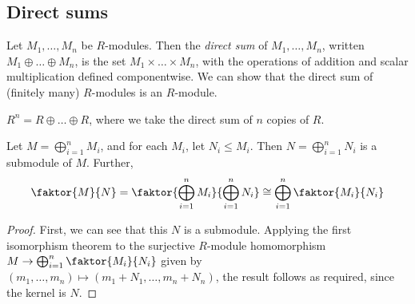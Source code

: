\subsection{Direct sums}
\begin{definition}
	Let \( M_1, \dots, M_n \) be \( R \)-modules.
	Then the \textit{direct sum} of \( M_1, \dots, M_n \), written \( M_1 \oplus \dots \oplus M_n \), is the set \( M_1 \times \dots \times M_n \), with the operations of addition and scalar multiplication defined componentwise.
	We can show that the direct sum of (finitely many) \( R \)-modules is an \( R \)-module.
\end{definition}
\begin{example}
	\( R^n = R \oplus \dots \oplus R \), where we take the direct sum of \( n \) copies of \( R \).
\end{example}
\begin{lemma}
	Let \( M = \bigoplus_{i=1}^n M_i \), and for each \( M_i \), let \( N_i \leq M_i \).
	Then \( N = \bigoplus_{i=1}^n N_i \) is a submodule of \( M \).
	Further,
	\[ \faktor{M}{N} = \faktor{\bigoplus_{i=1}^n M_i}{\bigoplus_{i=1}^n N_i} \cong \bigoplus_{i=1}^n \faktor{M_i}{N_i} \]
\end{lemma}
\begin{proof}
	First, we can see that this \( N \) is a submodule.
	Applying the first isomorphism theorem to the surjective \( R \)-module homomorphism \( M \to \bigoplus_{i=1}^n \faktor{M_i}{N_i} \) given by \( (m_1, \dots, m_n) \mapsto (m_1 + N_1, \dots, m_n + N_n) \), the result follows as required, since the kernel is \( N \).
\end{proof}

